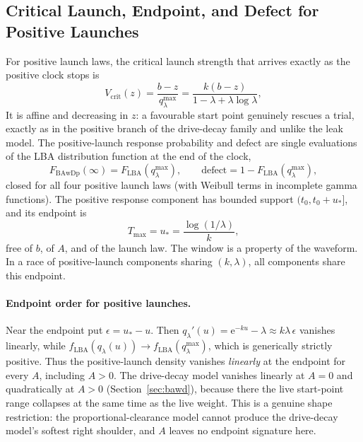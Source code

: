 \documentclass[12pt]{article}
\newcommand{\e}{\mathrm{e}}
\theoremstyle{remark}
\begin{document}
\subsection{Critical Launch, Endpoint, and Defect for Positive Launches}
For positive launch laws, the critical launch strength that arrives exactly as the positive clock stops is
\begin{equation}
  V_{\mathrm{crit}}(z) = \frac{b - z}{q_{\lambda}^{\max}}
  = \frac{k(b-z)}{1 - \lambda + \lambda\log\lambda},
  \label{eq:bawdp-crit}
\end{equation}
It is affine and decreasing in $z$: a favourable start point genuinely rescues a trial, exactly as in the positive branch of the drive-decay family and unlike the leak model. The positive-launch response probability and defect are single evaluations of the LBA distribution function at the end of the clock,
\begin{equation}
  F_{\mathrm{BAwDp}}(\infty)=F_{\mathrm{LBA}}\!\left(q_{\lambda}^{\max}\right),
  \qquad
  \text{defect}=1-F_{\mathrm{LBA}}\!\left(q_{\lambda}^{\max}\right),
  \label{eq:bawdp-defect}
\end{equation}
closed for all four positive launch laws (with Weibull terms in incomplete gamma functions). The positive response component has bounded support $(t_0,t_0+u_{*}]$, and its endpoint is
\begin{equation}
  T_{\max}=u_{*}=\frac{\log(1/\lambda)}{k},
\end{equation}
free of $b$, of $A$, and of the launch law. The window is a property of the waveform. In a race of positive-launch components sharing $(k,\lambda)$, all components share this endpoint.

\paragraph{Endpoint order for positive launches.} Near the endpoint put
$\epsilon=u_{*}-u$. Then $q_{\lambda}'(u)=\e^{-ku}-\lambda
\approx k\lambda\,\epsilon$ vanishes linearly, while
$f_{\mathrm{LBA}}(q_{\lambda}(u))\to f_{\mathrm{LBA}}(q_{\lambda}^{\max})$, which is generically strictly positive. Thus the positive-launch density vanishes \emph{linearly} at the endpoint for every $A$, including $A > 0$. The drive-decay model vanishes linearly at $A = 0$ and quadratically at $A > 0$ (Section~\ref{sec:bawd}), because there the live start-point range collapses at the same time as the live weight. This is a genuine shape restriction: the proportional-clearance model cannot produce the drive-decay model's softest right shoulder, and $A$ leaves no endpoint signature here.
\end{document}
